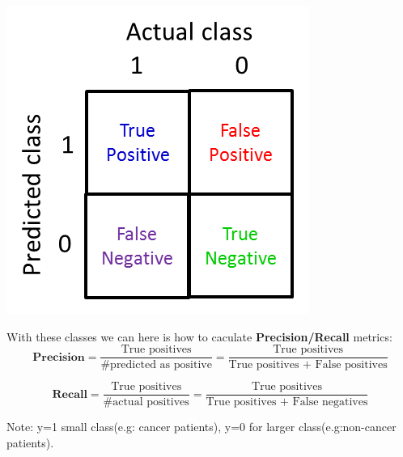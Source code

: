 \documentclass{article}
\begin{document}
\includegraphics[width=\textwidth]{TP_FP_TN_FN.png}

With these classes we can here is how to caculate \textbf{Precision/Recall} metrics:
$$\textbf{Precision} = \frac{\text{True positives}}{\text{\# predicted as positive}} = \frac{\text{True positives}}{\text{True positives + False positives}}$$

$$\textbf{Recall} = \frac{\text{True positives}}{\text{\# actual positives}} = \frac{\text{True positives}}{\text{True positives + False negatives}}$$


Note: y=1 small class(e.g: cancer patients), y=0 for larger class(e.g:non-cancer patients).
\end{document}
